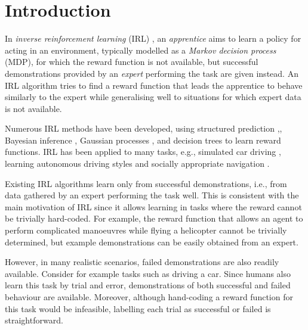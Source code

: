 \documentclass{aamas2016}
\begin{document}

\section{Introduction}

In \emph{inverse reinforcement learning} (IRL) \cite{ng2000algorithms}, an \emph{apprentice} aims to learn a policy for acting in an environment, typically modelled as a \emph{Markov decision process} (MDP), for which the reward function is not available, but successful demonstrations provided by an \emph{expert} performing the task are given instead. An IRL algorithm tries to find a reward function that leads the apprentice to behave  similarly to the expert while generalising well to situations for which expert data is not available. 

Numerous IRL methods have been developed, using structured prediction \cite{ratliff2006maximum},\cite{klein2012inverse}, Bayes\-ian inference \cite{ramachandran2007bayesian}, Gaussian processes \cite{levine2011nonlinear}, and decision trees \cite{ratliff2007boosting} to learn reward functions. IRL has been applied to many tasks, e.g., simulated car driving \cite{abbeel2004apprenticeship}, learning autonomous driving styles \cite{kuderer2015learning} and socially appropriate navigation \cite{henry2010learning,vasquez2014inverse}. 

Existing IRL algorithms learn only from successful demonstrations, i.e., from data gathered by an expert performing the task well. This is consistent with the main motivation of IRL since it allows learning in tasks where the reward cannot be trivially hard-coded.  For example, the reward function that allows an agent to perform complicated manoeuvres while flying a helicopter cannot be trivially determined, but example demonstrations can be easily obtained from an expert.

However, in many realistic scenarios, failed demonstrations are also readily available.  Consider for example tasks such as driving a car.  Since humans also learn this task by trial and error, demonstrations of both successful and failed behaviour are available. Moreover, although hand-coding a reward function for this task would be infeasible, labelling each trial as successful or failed is straightforward.
\end{document}
